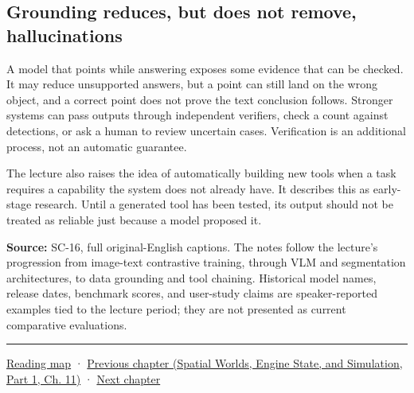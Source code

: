 \subsection{Grounding reduces, but does not remove, hallucinations}\label{04-visual-computing-ii-ch031-grounding-reduces-but-does-not-remove-hallucinations}

\hypertarget{04-visual-computing-ii-ch031-grounding-reduces-but-does-not-remove-hallucinations}{}

A model that points while answering exposes some evidence that can be checked. It may reduce unsupported answers, but a point can still land on the wrong object, and a correct point does not prove the text conclusion follows. Stronger systems can pass outputs through independent verifiers, check a count against detections, or ask a human to review uncertain cases. Verification is an additional process, not an automatic guarantee.

The lecture also raises the idea of automatically building new tools when a task requires a capability the system does not already have. It describes this as early-stage research. Until a generated tool has been tested, its output should not be treated as reliable just because a model proposed it.

\textbf{Source:} SC-16, full original-English captions. The notes follow the lecture's progression from image-text contrastive training, through VLM and segmentation architectures, to data grounding and tool chaining. Historical model names, release dates, benchmark scores, and user-study claims are speaker-reported examples tied to the lecture period; they are not presented as current comparative evaluations.

\begin{center}\rule{0.5\linewidth}{0.5pt}\end{center}

\hyperref[volume-reading-map]{Reading map} · \href{../05-Spatial-Worlds-Engine-State-and-Simulation-P01/main.pdf\#nameddest=04-visual-computing-ii-ch030-mesh-operators-boundaries-and-diffusion}{Previous chapter (Spatial Worlds, Engine State, and Simulation, Part 1, Ch. 11)} · \hyperref[04-visual-computing-ii-ch032-pose-estimation-and-robust-fitting]{Next chapter}

